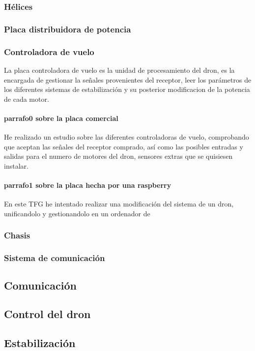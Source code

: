 \documentclass[spanish]{book}
\begin{document}
                \subsubsection{Hélices}
                \subsubsection{Placa distribuidora de potencia}
                \subsubsection{Controladora de vuelo}
                La placa controladora de vuelo es la unidad de procesamiento del dron, es la encargada de gestionar la señales provenientes del receptor, leer los parámetros de los diferentes sistemas de estabilización y su posterior modificacion de la potencia de cada motor.
                \paragraph{parrafo0 sobre la placa comercial}
                He realizado un estudio sobre las diferentes controladoras de vuelo, comprobando que aceptan las señales del receptor comprado, así como las posibles entradas y salidas para el numero de motores del dron, sensores extras que se quisiesen instalar.
                \paragraph{parrafo1 sobre la placa hecha por una raspberry}
                En este TFG he intentado realizar una modificación del sistema de un dron, unificandolo y gestionandolo en un ordenador de 
                \subsubsection{Chasis}
                \subsubsection{Sistema de comunicación}
      	 \subsection{Comunicación}
       	 \subsection{Control del dron}
       	 \subsection{Estabilización}
        
\end{document}
